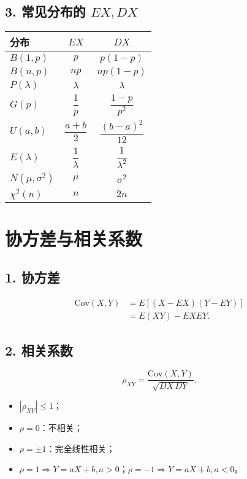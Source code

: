 \subsection*{3. 常见分布的 $EX,DX$}
\begin{center}
      \begin{tabular}{lcc}
            \toprule
            分布                & $EX$                 & $DX$                   \\
            \midrule
            $B(1,p)$          & $p$                  & $p(1-p)$               \\
            $B(n,p)$          & $np$                 & $np(1-p)$              \\
            $P(\lambda)$      & $\lambda$            & $\lambda$              \\
            $G(p)$            & $\dfrac1p$           & $\dfrac{1-p}{p^2}$     \\
            $U(a,b)$          & $\dfrac{a+b}{2}$     & $\dfrac{(b-a)^2}{12}$  \\
            $E(\lambda)$      & $\dfrac{1}{\lambda}$ & $\dfrac{1}{\lambda^2}$ \\
            $N(\mu,\sigma^2)$ & $\mu$                & $\sigma^2$             \\
            $\chi^2(n)$       & $n$                  & $2n$                   \\
            \bottomrule
      \end{tabular}
\end{center}


\section{协方差与相关系数}

\subsection*{1. 协方差}
\begin{align*}
      \mathrm{Cov}(X,Y)
       & =E[(X-EX)(Y-EY)] \\
       & =E(XY)-EXEY.
\end{align*}

\subsection*{2. 相关系数}
$$
      \rho_{XY}=\frac{\mathrm{Cov}(X,Y)}{\sqrt{DX\,DY}}.
$$
\begin{itemize}
      \item $|\rho_{XY}|\le1$；
      \item $\rho=0$：不相关；
      \item $\rho=\pm1$：完全线性相关；
      \item $\rho=1\Rightarrow Y=aX+b,a>0$；$\rho=-1\Rightarrow Y=aX+b,a<0$。
\end{itemize}

